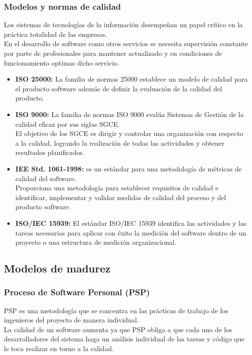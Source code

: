 \documentclass[12pt,twoside]{article}
\begin{document}
\subsubsection{Modelos y normas de calidad}
Los sistemas de tecnologías de la información desempeñan un papel crítico en la 
práctica totalidad de las empresas.\\
En el desarrollo de software como otros servicios se necesita supervisión constante 
por parte de profesionales para mantener actualizado y en condiciones de 
funcionamiento optimas dicho servicio.\\
\begin{itemize}
    \item \textbf{ISO 25000:} La familia de normas 25000 establece un modelo de calidad 
    para el producto software además de definir la evaluación de la calidad del 
    producto. 
    \item \textbf{ISO 9000:} La familia de normas ISO 9000 evalúa Sistemas de Gestión 
    de la calidad eficaz por sus siglas SGCE.\\
    El objetivo de los SGCE es dirigir y controlar una organización con respecto a la 
    calidad, logrando la realización de todas las actividades y obtener resultados 
    planificados.
    \item \textbf{IEE Std. 1061-1998:} es un estándar para una metodología de métricas 
    de calidad del software.\\
    Proporciona una metodología para establecer requisitos de calidad e identificar, 
    implementar y validar medidas de calidad del proceso y del producto software.
    \item \textbf{ISO/IEC 15939:} El estándar ISO/IEC 15939 identifica las actividades 
    y las tareas necesarias para aplicar con éxito la medición del software dentro de 
    un proyecto o una estructura de medición organizacional.
\end{itemize}

\subsection{Modelos de madurez}
\subsubsection{Proceso de Software Personal (PSP)}PSP es una metodología que se concentra 
en las prácticas de trabajo de los ingenieros del proyecto de manera individual.\\
La calidad de un software aumenta ya que PSP obliga a que cada uno de los desarrolladores 
del sistema haga un análisis individual de las tareas y código que le toca realizar 
en torno a la calidad.\\
\end{document}
